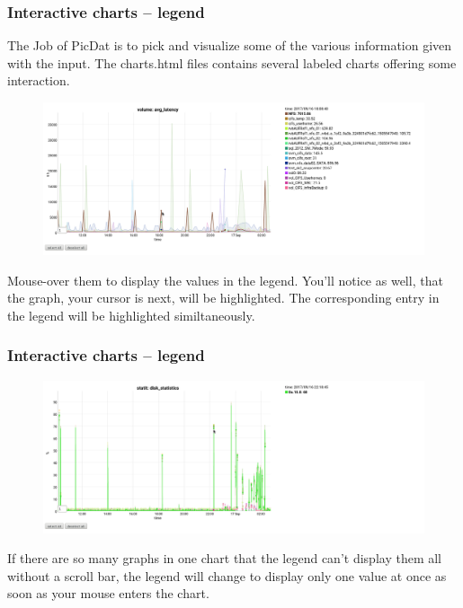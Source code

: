 \documentclass[8pt]{beamer}
\begin{document}
\begin{frame}
\frametitle{Interactive charts -- legend}
The Job of PicDat is to pick and visualize some of the various information given with the input. The charts.html files contains several labeled charts offering some interaction. 

\begin{figure}
	\includegraphics[width=\textwidth]{../images/PicDat_highlight2.png}
\end{figure}

Mouse-over them to display the values in the legend. You'll notice as well, that the graph, your cursor is next, will be highlighted. The corresponding entry in the legend will be highlighted similtaneously.
\end{frame}

\begin{frame}
\frametitle{Interactive charts -- legend} 
\begin{figure}
	\includegraphics[width=\textwidth]{../images/PicDat_singleValue.png}
\end{figure}

If there are so many graphs in one chart that the legend can't display them all without a scroll bar, the legend will change to display only one value at once as soon as your mouse enters the chart.
\end{frame}
\end{document}
